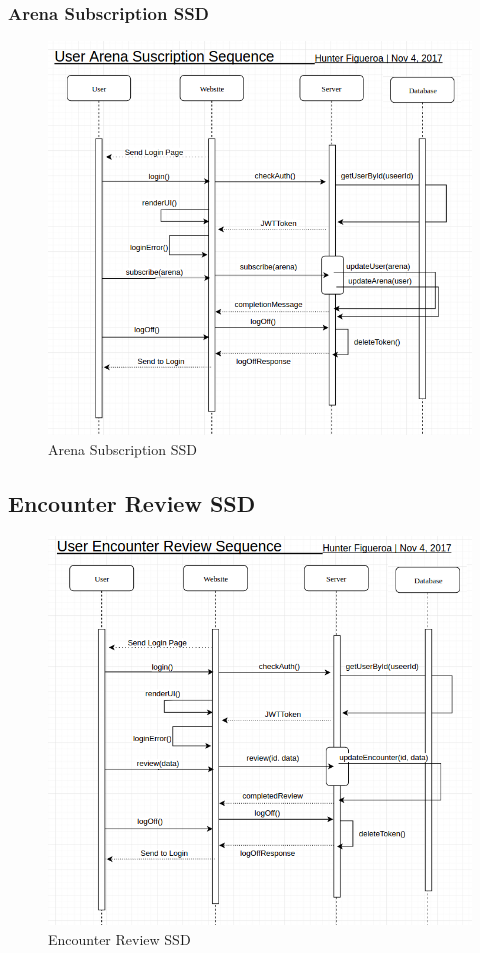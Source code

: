 \documentclass[12pt,a4paper]{report}
\begin{document}
	\newpage
	\subsubsection {Arena Subscription SSD}
	\begin{figure}[H]
		\centering
		\centerline{\includegraphics[scale=.75, angle=90]{ssd_subscribe}}
		\caption{Arena Subscription SSD}
		\label{fig: Arena Subscription SSD }
	\end{figure}

	\newpage
	\subsection {Encounter Review SSD}
	\begin{figure}[H]
		\centering
		\centerline{\includegraphics[scale=.7, angle=90]{ssd_review}}
		\caption{Encounter Review SSD}
		\label{fig: Encounter Review SSD }
	\end{figure}
\end{document}

